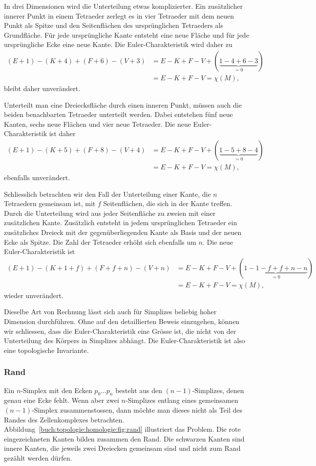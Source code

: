 In drei Dimensionen wird die Unterteilung etwas komplizierter.
Ein zusätzlicher innerer Punkt in einem Tetraeder zerlegt
es in vier Tetraeder mit dem neuen Punkt als Spitze und den
Seitenflächen des ursprünglichen Tetraeders als Grundfläche.
Für jede ursprüngliche Kante entsteht eine neue Fläche und
für jede ursprüngliche Ecke eine neue Kante.
Die Euler-Charakteristik wird daher zu
\begin{align*}
(E+1) - (K+4) + (F+6) - (V+3)
&=
E-K+F-V
+
(\underbrace{1-4+6-3}_{\displaystyle=0})
\\
&=
E-K+F-V
=
\chi(M),
\end{align*}
bleibt daher unverändert.

Unterteilt man eine Dreiecksfläche durch einen inneren Punkt,
müssen auch die beiden benachbarten Tetraeder unterteilt werden.
Dabei entstehen fünf neue Kanten, sechs neue Flächen und vier
neue Tetraeder.
Die neue Euler-Charakteristik ist daher
\begin{align*}
(E+1) - (K+5) + (F+8) - (V+4)
&=
E-K+F-V
+(\underbrace{1-5+8-4}_{\displaystyle=0})
\\
&=
E-K+F-V
=
\chi(M),
\end{align*}
ebenfalls unverändert.

Schliesslich betrachten wir den Fall der Unterteilung einer Kante,
die $n$ Tetraedern gemeinsam ist, mit $f$ Seitenflächen, die sich
in der Kante treffen.
Durch die Unterteilung wird aus jeder Seitenfläche zu zweien
mit einer zusätzlichen Kante.
Zusätzlich entsteht in jedem ursprünglichen Tetraeder ein zusätzliches
Dreieck mit der gegenüberliegenden Kante als Basis und der neuen
Ecke als Spitze.
Die Zahl der Tetraeder erhöht sich ebenfalls um $n$.
Die neue Euler-Charakteristik ist
\begin{align*}
(E+1)
-
(K+1+f)
+
(F+f+n)
-
(V+n)
&=
E-K+F-V + (\underbrace{1-1-f+f+n-n}_{\displaystyle=0})
\\
&=
E-K+F-V
=
\chi(M),
\end{align*}
wieder unverändert.

Dieselbe Art von Rechnung lässt sich auch für Simplizes beliebig hoher
Dimension durchführen.
Ohne auf den detaillierten Beweis einzugehen, können wir schliessen,
dass die Euler-Charakteristik eine Grösse ist, die nicht von der Unterteilung
des Körpers in Simplizes abhängt.
Die Euler-Charakteristik ist also eine topologische Invariante.

%
%
\subsubsection{Rand}
%
Ein $n$-Simplex mit den Ecken $p_0\dots p_n$ besteht aus den $(n-1)$-Simplizes,
denen genau eine Ecke fehlt.
Wenn aber zwei $n$-Simplizes entlang eines gemeinsamen $(n-1)$-Simplex
zusammenstossen, dann möchte man dieses nicht als Teil des Randes
des Zellenkomplexes betrachten.
Abbildung~\ref{buch:topologie:homologie:fig:rand} illustriert das Problem.
Die rote eingezeichneten Kanten bilden zusammen den Rand.
Die schwarzen Kanten sind innere Kanten, die jeweils zwei Dreiecken 
gemeinsam sind und nicht zum Rand gezählt werden dürfen.


